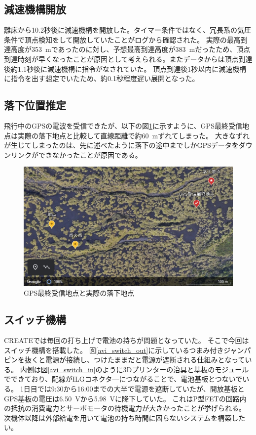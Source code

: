 \documentclass[a4paper,11pt,uplatex]{jsarticle}
\begin{document}
\subsection{減速機構開放}
離床から10.2秒後に減速機構を開放した。タイマー条件ではなく、冗長系の気圧条件で頂点検知をして開放していたことがログから確認された。
実際の最高到達高度が\SI{353}{m}であったのに対し、予想最高到達高度が\SI{383}{m}だったため、頂点到達時刻が早くなったことが原因として考えられる。またデータからは頂点到達後約1.1秒後に減速機構に指令がなされていた。
頂点到達後1秒以内に減速機構に指令を出す想定でいたため、約0.1秒程度遅い展開となった。

\subsection{落下位置推定}
飛行中のGPSの電波を受信できたが、以下の図\ref{fig:GPS_data}に示すように、GPS最終受信地点は実際の落下地点と比較して直線距離で約\SI{60}{m}ずれてしまった。
大きなずれが生じてしまったのは、先に述べたように落下の途中までしかGPSデータをダウンリンクができなかったことが原因である。

\begin{figure}[H]
	\centering
	\includegraphics[width=0.8\linewidth]{pic_avi/GPS_data.jpg}
	\caption{GPS最終受信地点と実際の落下地点}
	\label{fig:GPS_data}
\end{figure}

\subsection{スイッチ機構}
\label{switch}
CREATEでは毎回の打ち上げで電池の持ちが問題となっていた。
そこで今回はスイッチ機構を搭載した。
図\ref{avi_switch_out}に示しているつまみ付きジャンパピンを抜くと電源が接続し、つけたままだと電源が遮断される仕組みとなっている。
内側は図\ref{avi_switch_in}のように3Dプリンターの治具と基板のモジュールでできており、配線がILGコネクタ―につながることで、電池基板とつないでいる。
1日目では9:30から16:00までの大半で電源を遮断していたが、開放基板とGPS基板の電圧は\SI{6.50}{V}から\SI{5.98}{V}に降下していた。
これはP型FETの回路内の抵抗の消費電力とサーボモータの待機電力が大きかったことが挙げられる。
次機体以降は外部給電を用いて電池の持ち時間に困らないシステムを構築したい。
\end{document}
